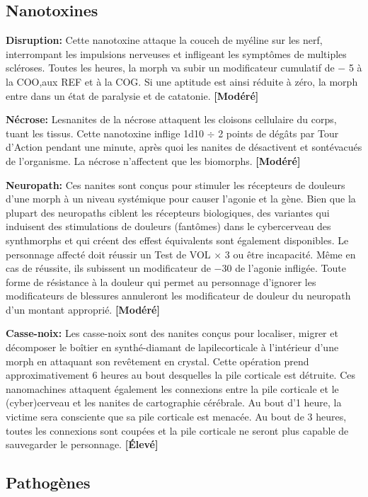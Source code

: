 \subsection{Nanotoxines} \label{sec:nanotoxins} 

\textbf{Disruption:} Cette nanotoxine attaque la couceh de myéline sur les nerf, interrompant les impulsions nerveuses et infligeant les symptômes de multiples scléroses. Toutes les heures, la morph va subir un modificateur cumulatif de $-$ 5 à la COO,aux REF et à la COG. Si une aptitude est ainsi réduite à zéro, la morph entre dans un état de paralysie et de catatonie. \textbf{[Modéré]} 

\textbf{Nécrose:} Lesnanites de la nécrose attaquent les cloisons cellulaire du corps, tuant les tissus. Cette nanotoxine inflige 1d10 $\div$ 2 points de dégâts par Tour d'Action pendant une minute, après quoi les nanites de désactivent et sontévacués de l'organisme. La nécrose n'affectent que les biomorphs. \textbf{[Modéré]} 

\textbf{Neuropath:} Ces nanites sont conçus pour stimuler les récepteurs de douleurs d'une morph à un niveau systémique pour causer l'agonie et la gène. Bien que la plupart des neuropaths ciblent les récepteurs biologiques, des variantes qui induisent des stimulations de douleurs (fantômes) dans le cybercerveau des synthmorphs et qui créent des effest équivalents sont également disponibles. Le personnage affecté doit réussir un Test de VOL $\times$ 3 ou être incapacité. Même en cas de réussite, ils subissent un modificateur de $-$30 de l'agonie infligée. Toute forme de résistance à la douleur qui permet au personnage d'ignorer les modificateurs de blessures annuleront les modificateur de douleur du neuropath d'un montant approprié. \textbf{[Modéré]} 

\textbf{Casse-noix:} Les casse-noix sont des nanites conçus pour localiser, migrer et décomposer le boîtier en synthé-diamant de lapilecorticale à l'intérieur d'une morph en attaquant son revêtement en crystal. Cette opération prend approximativement 6 heures au bout desquelles la pile corticale est détruite. Ces nanomachines attaquent également les connexions entre la pile corticale et le (cyber)cerveau et les nanites de cartographie cérébrale. Au bout d'1 heure, la victime sera consciente que sa pile corticale est menacée. Au bout de 3 heures, toutes les connexions sont coupées et la pile corticale ne seront plus capable de sauvegarder le personnage. \textbf{[Élevé]} 

\subsection{Pathogènes} \label{sec:pathogens} 

